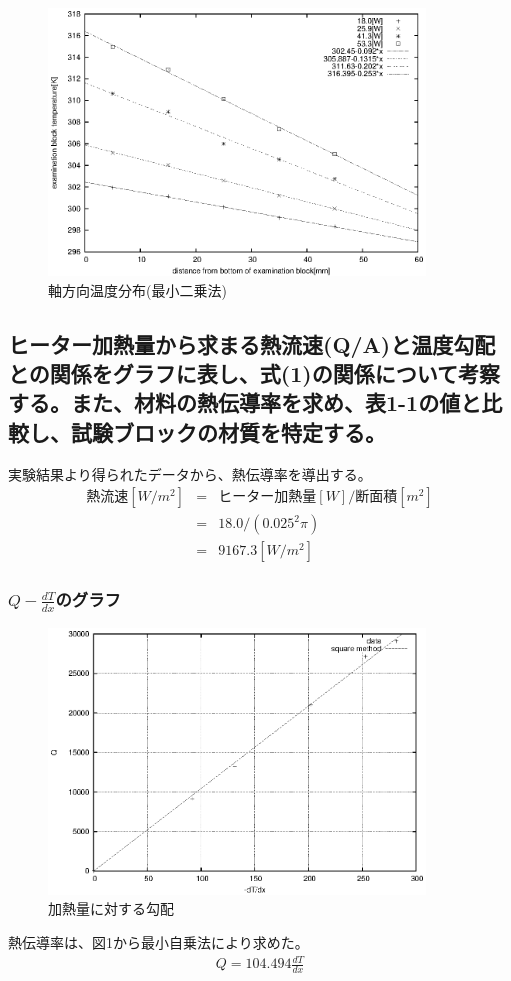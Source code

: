 \documentclass[a4j,twoside,openright,11pt]{jarticle}
\begin{document}
\begin{figure}[htbp]
\begin{center}
  \includegraphics[width=10cm]{./fulie/data2.eps}
\end{center}
\caption{軸方向温度分布(最小二乗法)}
\end{figure}
\newpage
\subsection{ヒーター加熱量から求まる熱流速(Q/A)と温度勾配との関係をグラフに表し、式(1)の関係について考察する。また、材料の熱伝導率を求め、表1-1の値と比較し、試験ブロックの材質を特定する。}
実験結果より得られたデータから、熱伝導率を導出する。
\begin{eqnarray}
熱流速[W/m^2] &=& ヒーター加熱量[W] /　断面積[m^2]\nonumber\\
              &=& 18.0/(0.025^2\pi)\nonumber\\
              &=& 9167.3[W/m^2]
\end{eqnarray}

\subsubsection{$Q-\frac{dT}{dx}$のグラフ}
\begin{figure}[htbp]
\begin{center}
  \includegraphics[width=10cm]{./q-dtdx/data.eps}
\end{center}
\caption{加熱量に対する勾配}
\end{figure}
熱伝導率は、図1から最小自乗法により求めた。
\begin{eqnarray}
Q=104.494\frac{dT}{dx}
\end{eqnarray}
\end{document}
